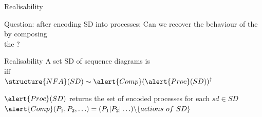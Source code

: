\documentclass[aspectratio=169]{beamer}
\begin{document}
\begin{slide}{Realisability}

  \begin{block}{Question: after encoding SD into processes:}
    \centering
    Can we recover the behaviour of the 
    \\
    by \alert{composing}
    \\
    the ?
  \end{block}

  \begin{block}{Realisability}
    \centering
    A set SD of sequence diagrams is 
    \\[2mm]
    iff
    \\[2mm]
    $\structure{NFA}(SD) \sim \alert{Comp}(\alert{Proc}(SD))^{\dagger}$
  \end{block}

  $\alert{Proc}(SD)$ returns the set of encoded processes for each $sd\in SD$
  \\
  $\alert{Comp}(P_1,P_2,\ldots) = (P_1 | P_2 | \ldots) \backslash \{actions~of~SD\}$ 
  
\end{slide}
\end{document}
